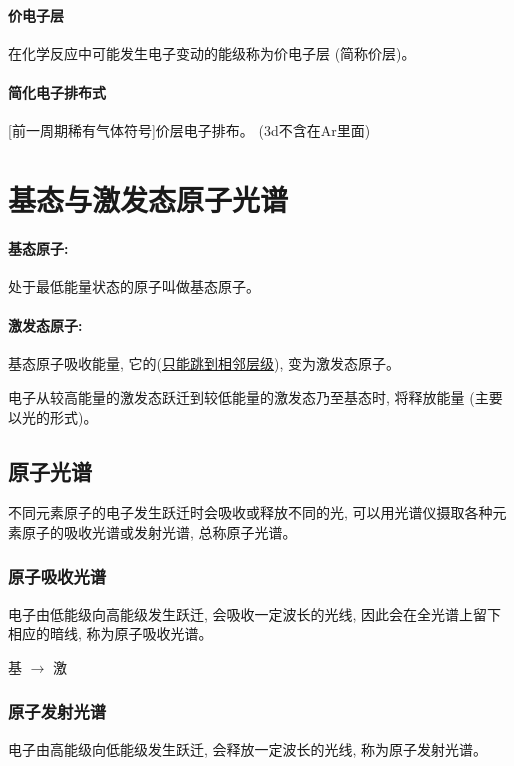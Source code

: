 \documentclass[10pt,cn]{elegantbook}
\begin{document}
	\paragraph*{价电子层}在化学反应中可能发生电子变动的能级称为价电子层 (简称价层)。
	\paragraph*{简化电子排布式} [前一周期稀有气体符号]价层电子排布。 (3d不含在Ar里面)
	
	\section{基态与激发态原子光谱}
	
	\paragraph*{基态原子:} 处于最低能量状态的原子叫做基态原子。
	
	\paragraph*{激发态原子:} 基态原子吸收能量, 它的(\uline{只能跳到相邻层级}), 变为激发态原子。
	
	电子从较高能量的激发态跃迁到较低能量的激发态乃至基态时, 将释放能量 (主要以光的形式)。
	
	\subsection{原子光谱}
	
	不同元素原子的电子发生跃迁时会吸收或释放不同的光, 可以用光谱仪摄取各种元素原子的吸收光谱或发射光谱, 总称原子光谱。
	\subsubsection{原子吸收光谱}
	
	电子由低能级向高能级发生跃迁, 会吸收一定波长的光线, 因此会在全光谱上留下相应的暗线, 称为原子吸收光谱。
	
	基 \(  \rightarrow   \) 激
	
	\subsubsection{原子发射光谱}
	
	电子由高能级向低能级发生跃迁, 会释放一定波长的光线, 称为原子发射光谱。
	
\end{document}
